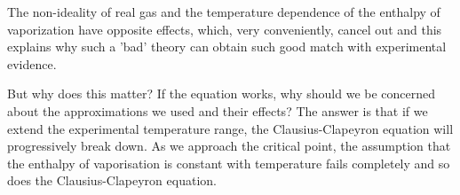 \documentclass[12pt,a4paper]{report}
\begin{document}
   The non-ideality of real gas and the temperature dependence of the enthalpy of vaporization have opposite effects, which, very conveniently, cancel out and this explains why such a 'bad' theory can obtain such good match with experimental evidence.
   
   But why does this matter? If the equation works, why should we be concerned about the approximations we used and their effects? The answer is that if we extend the experimental temperature range, the Clausius-Clapeyron equation will progressively break down. As we approach the critical point, the assumption that the enthalpy of vaporisation is constant with temperature fails completely and so does the Clausius-Clapeyron equation. 
\end{document}
